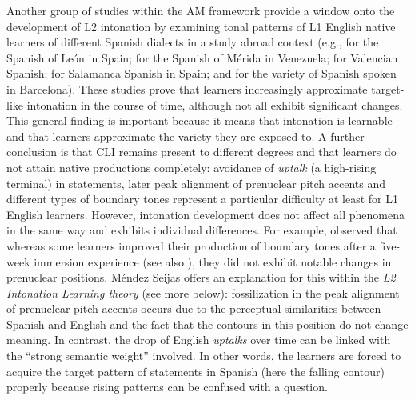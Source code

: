 Another group of studies within the AM framework provide a window onto the development of L2 intonation by examining tonal patterns of L1 English native learners of different Spanish dialects in a study abroad context (e.g., \citealt{HenriksenEtAl2010} for the Spanish of León in Spain; \citealt{Trimble2013} for the Spanish of Mérida in Venezuela; \citealt{Craft2015} for Valencian Spanish; \citealt{Buck2016} for Salamanca Spanish in Spain; and  \citealt{MéndezSeijas2018} for the variety of Spanish spoken in Barcelona). These studies prove that learners increasingly approximate target-like intonation in the course of time, although not all exhibit significant changes. This general finding is important because it means that intonation is learnable and that learners approximate the variety they are exposed to. A further conclusion is that CLI remains present to different degrees and that learners do not attain native productions completely: avoidance of \textit{uptalk} (a high-rising terminal) in statements, later peak alignment of prenuclear pitch accents and different types of boundary tones represent a particular difficulty at least for L1 English learners. However, intonation development does not affect all phenomena in the same way and exhibits individual differences. For example,  \citet{MéndezSeijas2018} observed that whereas some learners improved their production of boundary tones after a five-week immersion experience (see also \citealt{Zárate-Sández2018}), they did not exhibit notable changes in prenuclear positions. Méndez Seijas offers an explanation for this within the \textit{L2 Intonation Learning theory} (see more below): fossilization in the peak alignment of prenuclear pitch accents occurs due to the perceptual similarities between Spanish and English and the fact that the contours in this position do not change meaning. In contrast, the drop of English \textit{uptalks} over time can be linked with the “strong semantic weight” involved. In other words, the learners are forced to acquire the target pattern of statements in Spanish (here the falling contour) properly because rising patterns can be confused with a question.



